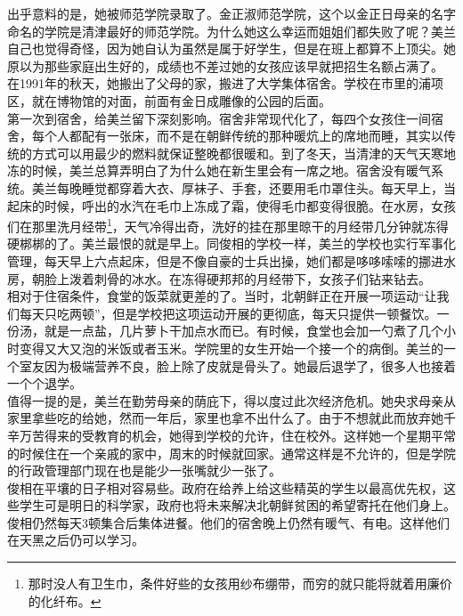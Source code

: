 \begin{multicols}{\theparacolNo}
出乎意料的是，她被师范学院录取了。金正淑师范学院，这个以金正日母亲的名字命名的学院是清津最好的师范学院。为什么她这么幸运而姐姐们都失败了呢？美兰自己也觉得奇怪，因为她自认为虽然是属于好学生，但是在班上都算不上顶尖。她原以为那些家庭出生好的，成绩也不差过她的女孩应该早就把招生名额占满了。\\

在1991年的秋天，她搬出了父母的家，搬进了大学集体宿舍。学校在市里的浦项区，就在博物馆的对面，前面有金日成雕像的公园的后面。\\

第一次到宿舍，给美兰留下深刻影响。宿舍非常现代化了，每四个女孩住一间宿舍，每个人都配有一张床，而不是在朝鲜传统的那种暖炕上的席地而睡，其实以传统的方式可以用最少的燃料就保证整晚都很暖和。到了冬天，当清津的天气天寒地冻的时候，美兰总算弄明白了为什么她在新生里会有一席之地。宿舍没有暖气系统。美兰每晚睡觉都穿着大衣、厚袜子、手套，还要用毛巾罩住头。每天早上，当起床的时候，呼出的水汽在毛巾上冻成了霜，使得毛巾都变得很脆。在水房，女孩们在那里洗月经带\footnote{那时没人有卫生巾，条件好些的女孩用纱布绷带，而穷的就只能将就着用廉价的化纤布。}，天气冷得出奇，洗好的挂在那里晾干的月经带几分钟就冻得硬梆梆的了。美兰最恨的就是早上。同俊相的学校一样，美兰的学校也实行军事化管理，每天早上六点起床，但是不像自豪的士兵出操，她们都是哆哆嗦嗦的挪进水房，朝脸上泼着刺骨的冰水。在冻得硬邦邦的月经带下，女孩子们钻来钻去。\\

相对于住宿条件，食堂的饭菜就更差的了。当时，北朝鲜正在开展一项运动“让我们每天只吃两顿”，但是学校把这项运动开展的更彻底，每天只提供一顿餐饮。一份汤，就是一点盐，几片萝卜干加点水而已。有时候，食堂也会加一勺煮了几个小时变得又大又泡的米饭或者玉米。学院里的女生开始一个接一个的病倒。美兰的一个室友因为极端营养不良，脸上除了皮就是骨头了。她最后退学了，很多人也接着一个个退学。\\

值得一提的是，美兰在勤劳母亲的荫庇下，得以度过此次经济危机。她央求母亲从家里拿些吃的给她，然而一年后，家里也拿不出什么了。由于不想就此而放弃她千辛万苦得来的受教育的机会，她得到学校的允许，住在校外。这样她一个星期平常的时候住在一个亲戚的家中，周末的时候就回家。通常这样是不允许的，但是学院的行政管理部门现在也是能少一张嘴就少一张了。\\

俊相在平壤的日子相对容易些。政府在给养上给这些精英的学生以最高优先权，这些学生可是明日的科学家，政府也将未来解决北朝鲜贫困的希望寄托在他们身上。俊相仍然每天3顿集合后集体进餐。他们的宿舍晚上仍然有暖气、有电。这样他们在天黑之后仍可以学习。\\


\end{multicols}
